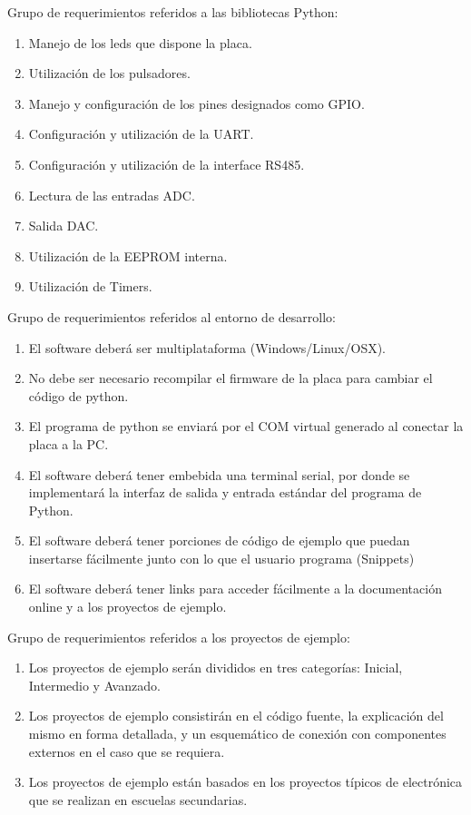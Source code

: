 Grupo de requerimientos referidos a las bibliotecas Python:
\begin{enumerate}
	\item  Manejo de los leds que dispone la placa.
	\item  Utilización de los pulsadores.
	\item  Manejo y configuración de los pines designados como GPIO. 
	\item  Configuración y utilización de la UART.
	\item  Configuración y utilización de la interface RS485.
	\item  Lectura de las entradas ADC.
	\item  Salida DAC.
	\item  Utilización de la EEPROM interna.
	\item  Utilización de Timers.
\end{enumerate}

Grupo de requerimientos referidos al entorno de desarrollo:
\begin{enumerate}
	\item  El software deberá ser multiplataforma (Windows/Linux/OSX).
	\item  No debe ser necesario recompilar el firmware de la placa para cambiar el código de python.
	\item  El programa de python se enviará por el COM virtual generado al conectar la placa a la PC. 
	\item  El software deberá tener embebida una terminal serial, por donde se implementará la interfaz de salida y entrada estándar del programa de Python. 
	\item  El software deberá tener porciones de código de ejemplo que puedan insertarse fácilmente junto con lo que el usuario programa (Snippets)
	\item  El software deberá tener links para acceder fácilmente a la documentación online y a los proyectos de ejemplo.
\end{enumerate}

Grupo de requerimientos referidos a los proyectos de ejemplo:
\begin{enumerate}
	\item  Los proyectos de ejemplo serán divididos en tres categorías: Inicial, Intermedio y Avanzado. 
	\item  Los proyectos de ejemplo consistirán en el código fuente, la explicación del mismo en forma detallada, y un esquemático de conexión con componentes externos en el caso que se requiera.
	\item  Los proyectos de ejemplo están basados en los proyectos típicos de electrónica que se realizan en escuelas secundarias. 
\end{enumerate}

